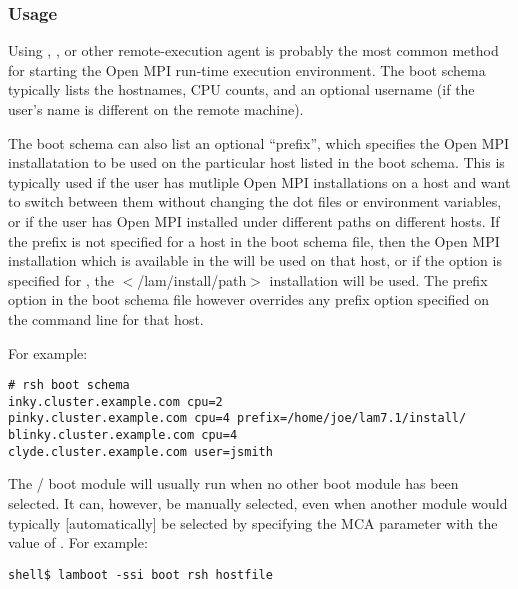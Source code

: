 
\subsubsection{Usage}

Using , , or other remote-execution agent is
probably the most common method for starting the Open MPI run-time
execution environment.  The boot schema typically lists the hostnames,
CPU counts, and an optional username (if the user's name is different
on the remote machine).  


The boot schema can also list an optional ``prefix'', which specifies
the Open MPI installatation to be used on the particular host listed in
the boot schema. This is typically used if the user has mutliple
Open MPI installations on a host and want to switch between them
without changing the dot files or  environment variables,
or if the user has Open MPI installed under different paths on
different hosts.  If the prefix is not specified for a host in the
boot schema file, then the Open MPI installation which is available in
the  will be used on that host, or if the  option is specified for , the
$<$/lam/install/path$>$ installation will be used.  The prefix option
in the boot schema file however overrides any prefix option specified
on the  command line for that host.

For example:

\lstset{style=lam-shell}
\begin{lstlisting}
# rsh boot schema
inky.cluster.example.com cpu=2
pinky.cluster.example.com cpu=4 prefix=/home/joe/lam7.1/install/
blinky.cluster.example.com cpu=4
clyde.cluster.example.com user=jsmith
\end{lstlisting}


The  /  boot module will usually run when no other
boot module has been selected.  It can, however, be manually selected,
even when another module would typically [automatically] be selected
by specifying the  MCA parameter with the value of
.  For example:

\lstset{style=lam-cmdline}
\begin{lstlisting}
shell$ lamboot -ssi boot rsh hostfile
\end{lstlisting}

